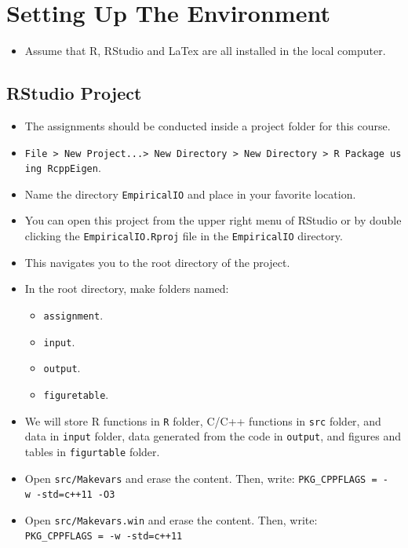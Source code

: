 \documentclass[
]{book}
\providecommand{\tightlist}{%
  \setlength{\itemsep}{0pt}\setlength{\parskip}{0pt}}
\begin{document}
\hypertarget{setting-up-the-environment}{%
\section{Setting Up The Environment}\label{setting-up-the-environment}}

\begin{itemize}
\tightlist
\item
  Assume that R, RStudio and LaTex are all installed in the local computer.
\end{itemize}

\hypertarget{rstudio-project}{%
\subsection{RStudio Project}\label{rstudio-project}}

\begin{itemize}
\tightlist
\item
  The assignments should be conducted inside a project folder for this course.
\item
  \texttt{File\ \textgreater{}\ New\ Project...\textgreater{}\ New\ Directory\ \textgreater{}\ New\ Directory\ \textgreater{}\ R\ Package\ using\ RcppEigen}.
\item
  Name the directory \texttt{EmpiricalIO} and place in your favorite location.
\item
  You can open this project from the upper right menu of RStudio or by double clicking the \texttt{EmpiricalIO.Rproj} file in the \texttt{EmpiricalIO} directory.
\item
  This navigates you to the root directory of the project.
\item
  In the root directory, make folders named:

  \begin{itemize}
  \tightlist
  \item
    \texttt{assignment}.
  \item
    \texttt{input}.
  \item
    \texttt{output}.
  \item
    \texttt{figuretable}.
  \end{itemize}
\item
  We will store R functions in \texttt{R} folder, C/C++ functions in \texttt{src} folder, and data in \texttt{input} folder, data generated from the code in \texttt{output}, and figures and tables in \texttt{figurtable} folder.
\item
  Open \texttt{src/Makevars} and erase the content. Then, write: \texttt{PKG\_CPPFLAGS\ =\ -w\ -std=c++11\ -O3}
\item
  Open \texttt{src/Makevars.win} and erase the content. Then, write: \texttt{PKG\_CPPFLAGS\ =\ -w\ -std=c++11}
\end{itemize}
\end{document}

